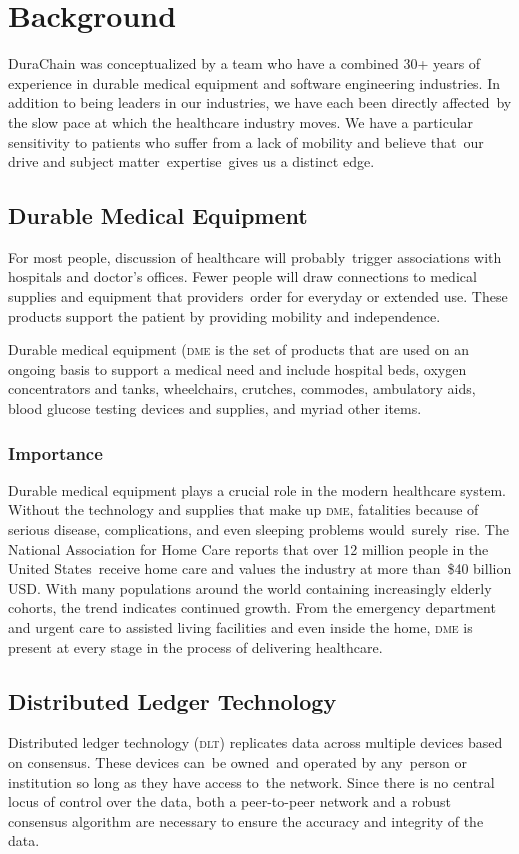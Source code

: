 
\section{Background}
DuraChain was conceptualized by a team who have a combined 30+ years of experience in durable medical equipment and software engineering industries. In addition to being leaders in our industries, we have each been directly affected by the slow pace at which the healthcare industry moves. We have a particular sensitivity to patients who suffer from a lack of mobility and believe that our drive and subject matter expertise gives us a distinct edge.%

\subsection{Durable Medical Equipment}
For most people, discussion of healthcare will probably trigger associations with hospitals and doctor's offices. Fewer people will draw connections to medical supplies and equipment that providers order for everyday or extended use. These products support the patient by providing mobility and independence.%

Durable medical equipment (\textsc{dme} is the set of products that are used on an ongoing basis to support a medical need and include hospital beds, oxygen concentrators and tanks, wheelchairs, crutches, commodes, ambulatory aids, blood glucose testing devices and supplies, and myriad other items.\cite{dmeDefinition}%

\subsubsection{Importance}
Durable medical equipment plays a crucial role in the modern healthcare system. Without the technology and supplies that make up \textsc{dme}, fatalities because of serious disease, complications, and even sleeping problems would surely rise. The National Association for Home Care reports that over 12 million people in the United States receive home care and values the industry at more than \$40 billion USD.\cite{homecarestats}\cite{dmemarket} With many populations around the world containing increasingly elderly cohorts, the trend indicates continued growth. From the emergency department and urgent care to assisted living facilities and even inside the home, \textsc{dme} is present at every stage in the process of delivering healthcare.%

\subsection{Distributed Ledger Technology}
Distributed ledger technology (\textsc{dlt}) replicates data across multiple devices based on consensus. These devices can be owned and operated by any person or institution so long as they have access to the network. Since there is no central locus of control over the data, both a peer-to-peer network and a robust consensus algorithm are necessary to ensure the accuracy and integrity of the data.\cite{DLT}%

